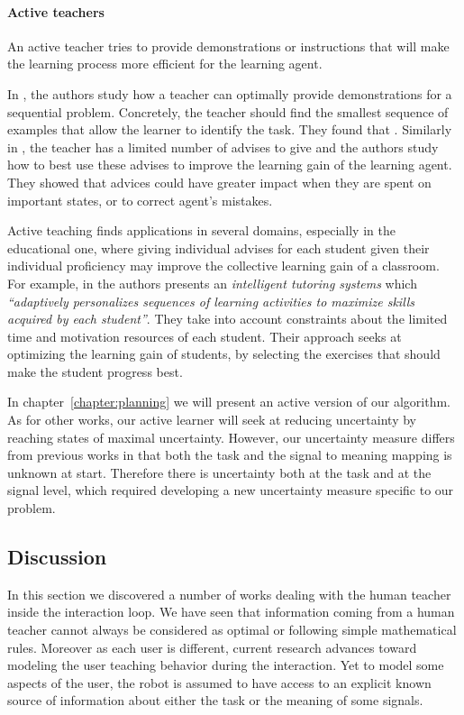\paragraph{Active teachers}

An active teacher tries to provide demonstrations or instructions that will make the learning process more efficient for the learning agent. 

In \cite{cakmak2012algorithmic}, the authors study how a teacher can optimally provide demonstrations for a sequential problem. Concretely, the teacher should find the smallest sequence of examples that allow the learner to identify the task. They found that . Similarly in \cite{torrey2013teaching}, the teacher has a limited number of advises to give and the authors study how to best use these advises to improve the learning gain of the learning agent. They showed that advices could have greater impact when they are spent on important states, or to correct agent's mistakes.

Active teaching finds applications in several domains, especially in the educational one, where giving individual advises for each student given their individual proficiency may improve the collective learning gain of a classroom. For example, in \cite{clement2014online} the authors presents an \emph{intelligent tutoring systems} which \textit{``adaptively personalizes sequences of learning activities to maximize skills acquired by each student''}. They take into account constraints about the limited time and motivation resources of each student. Their approach seeks at optimizing the learning gain of students, by selecting the exercises that should make the student progress best.
 
\transition

In chapter~\ref{chapter:planning} we will present an active version of our algorithm. As for other works, our active learner will seek at reducing uncertainty by reaching states of maximal uncertainty. However, our uncertainty measure differs from previous works in that both the task and the signal to meaning mapping is unknown at start. Therefore there is uncertainty both at the task and at the signal level, which required developing a new uncertainty measure specific to our problem.

\subsection{Discussion}

In this section we discovered a number of works dealing with the human teacher inside the interaction loop. We have seen that information coming from a human teacher cannot always be considered as optimal or following simple mathematical rules. Moreover as each user is different, current research advances toward modeling the user teaching behavior during the interaction. Yet to model some aspects of the user, the robot is assumed to have access to an explicit known source of information about either the task or the meaning of some signals.

